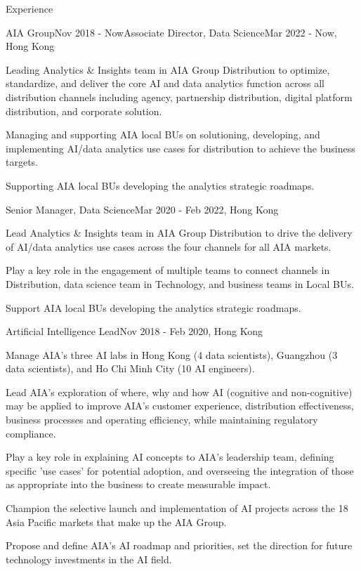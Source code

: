 \documentclass{resume} %
\begin{document}
\begin{rSection}{Experience}

\begin{rSubsection}{AIA Group}{Nov 2018 - Now}{Associate Director, Data Science}{Mar 2022 - Now, Hong Kong}
\item Leading Analytics \& Insights team in AIA Group Distribution to optimize, standardize, and deliver the core AI and data analytics function across all distribution channels including agency, partnership distribution, digital platform distribution, and corporate solution.
\item Managing and supporting AIA local BUs on solutioning, developing, and implementing AI/data analytics use cases for distribution to achieve the business targets.
\item Supporting AIA local BUs developing the analytics strategic roadmaps.
\end{rSubsection}


\begin{rSubsection}{}{}{Senior Manager, Data Science}{Mar 2020 - Feb 2022, Hong Kong}
\item Lead Analytics \& Insights team in AIA Group Distribution to drive the delivery of AI/data analytics use cases across the four channels for all AIA markets.
\item Play a key role in the engagement of multiple teams to connect channels in Distribution, data science team in Technology, and business teams in Local BUs.
\item Support AIA local BUs developing the analytics strategic roadmaps.
\end{rSubsection}


\begin{rSubsection}{}{}{Artificial Intelligence Lead}{Nov 2018 - Feb 2020, Hong Kong}
\item Manage AIA’s three AI labs in Hong Kong (4 data scientists), Guangzhou (3 data scientists), and Ho Chi Minh City (10 AI engineers).
\item Lead AIA's exploration of where, why and how AI (cognitive and non-cognitive) may be applied to improve AIA's customer experience, distribution effectiveness, business processes and operating efficiency, while maintaining regulatory compliance.
\item Play a key role in explaining AI concepts to AIA's leadership team, defining specific 'use cases' for potential adoption, and overseeing the integration of those as appropriate into the business to create measurable impact.
\item Champion the selective launch and implementation of AI projects across the 18 Asia Pacific markets that make up the AIA Group.
\item Propose and define AIA's AI roadmap and priorities, set the direction for future technology investments in the AI field.
\end{rSubsection}


\end{rSection}
\end{document}
